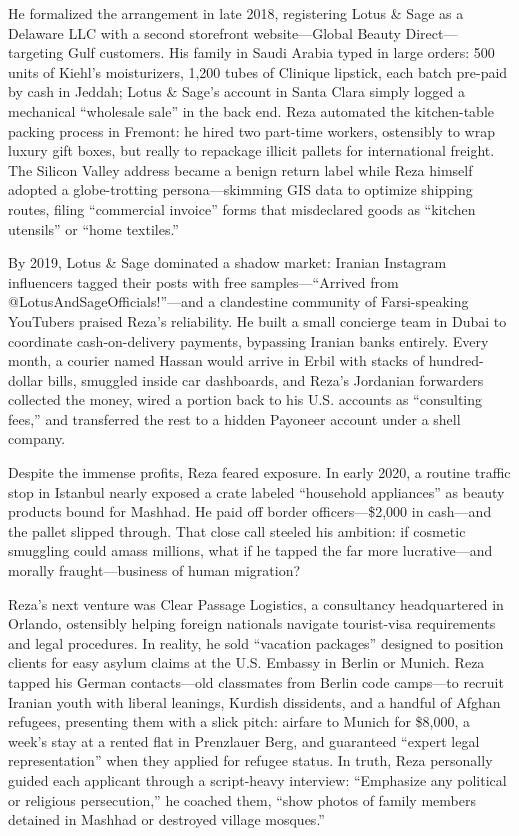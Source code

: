 He formalized the arrangement in late 2018, registering Lotus \& Sage as a Delaware LLC with a second storefront website—Global Beauty Direct—targeting Gulf customers. His family in Saudi Arabia typed in large orders: 500 units of Kiehl’s moisturizers, 1,200 tubes of Clinique lipstick, each batch pre-paid by cash in Jeddah; Lotus \& Sage’s account in Santa Clara simply logged a mechanical “wholesale sale” in the back end. Reza automated the kitchen-table packing process in Fremont: he hired two part-time workers, ostensibly to wrap luxury gift boxes, but really to repackage illicit pallets for international freight. The Silicon Valley address became a benign return label while Reza himself adopted a globe-trotting persona—skimming GIS data to optimize shipping routes, filing “commercial invoice” forms that misdeclared goods as “kitchen utensils” or “home textiles.”

By 2019, Lotus \& Sage dominated a shadow market: Iranian Instagram influencers tagged their posts with free samples—“Arrived from @LotusAndSageOfficials!”—and a clandestine community of Farsi-speaking YouTubers praised Reza’s reliability. He built a small concierge team in Dubai to coordinate cash-on-delivery payments, bypassing Iranian banks entirely. Every month, a courier named Hassan would arrive in Erbil with stacks of hundred-dollar bills, smuggled inside car dashboards, and Reza’s Jordanian forwarders collected the money, wired a portion back to his U.S. accounts as “consulting fees,” and transferred the rest to a hidden Payoneer account under a shell company.

Despite the immense profits, Reza feared exposure. In early 2020, a routine traffic stop in Istanbul nearly exposed a crate labeled “household appliances” as beauty products bound for Mashhad. He paid off border officers—\$2,000 in cash—and the pallet slipped through. That close call steeled his ambition: if cosmetic smuggling could amass millions, what if he tapped the far more lucrative—and morally fraught—business of human migration?

Reza’s next venture was Clear Passage Logistics, a consultancy headquartered in Orlando, ostensibly helping foreign nationals navigate tourist-visa requirements and legal procedures. In reality, he sold “vacation packages” designed to position clients for easy asylum claims at the U.S. Embassy in Berlin or Munich. Reza tapped his German contacts—old classmates from Berlin code camps—to recruit Iranian youth with liberal leanings, Kurdish dissidents, and a handful of Afghan refugees, presenting them with a slick pitch: airfare to Munich for \$8,000, a week’s stay at a rented flat in Prenzlauer Berg, and guaranteed “expert legal representation” when they applied for refugee status. In truth, Reza personally guided each applicant through a script-heavy interview: “Emphasize any political or religious persecution,” he coached them, “show photos of family members detained in Mashhad or destroyed village mosques.”

